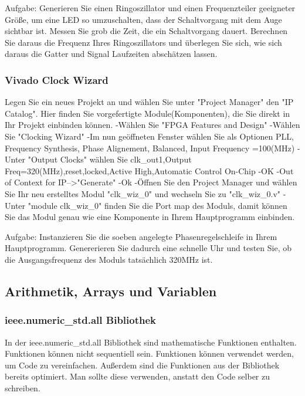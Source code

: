 \documentclass{article}
\begin{document}
Aufgabe:\newline
Generieren Sie einen Ringoszillator und einen Frequenzteiler geeigneter Größe, um eine LED so umzuschalten, dass der Schaltvorgang mit dem Auge sichtbar ist. Messen Sie grob die Zeit, die ein Schaltvorgang dauert. Berechnen Sie daraus die Frequenz Ihres Ringoszillators und \"uberlegen Sie sich, wie sich daraus die Gatter und Signal Laufzeiten absch\"atzen lassen.

\subsubsection{Vivado Clock Wizard}
Legen Sie ein neues Projekt an und w\"ahlen Sie unter "Project Manager" den "IP Catalog". Hier finden Sie vorgefertigte Module(Komponenten), die Sie direkt in Ihr Projekt einbinden k\"onnen.\newline
-W\"ahlen Sie "FPGA Features and Design"\newline
-W\"ahlen Sie "Clocking Wizard"\newline
-Im nun ge\"offneten Fenster w\"ahlen Sie als Optionen PLL, Frequency Synthesis, Phase Alignement, Balanced, Input Frequency =100(MHz)\newline
-Unter "Output Clocks" w\"ahlen Sie clk\_out1,Output Freq=320(MHz),reset,locked,Active High,Automatic Control On-Chip\newline
-OK\newline
-Out of Context for IP-->"Generate"\newline
-Ok\newline
-\"Offnen Sie den Project Manager und w\"ahlen Sie Ihr neu erstelltes Modul "clk\_wiz\_0" und wechseln Sie zu "clk\_wiz\_0.v"\newline
-Unter "module clk\_wiz\_0" finden Sie die Port map des Moduls, damit k\"onnen Sie das Modul genau wie eine Komponente in Ihrem Hauptprogramm einbinden.\newline

Aufgabe:\newline
Instanzieren Sie die soeben angelegte Phasenregelschleife in Ihrem Hauptprogramm. Genererieren Sie dadurch eine schnelle Uhr und testen Sie, ob die Ausgangsfrequenz des Moduls tats\"achlich 320MHz ist.

\subsection{Arithmetik, Arrays und Variablen}
\subsubsection{ieee.numeric\_std.all Bibliothek}
In der ieee.numeric\_std.all Bibliothek sind mathematische Funktionen enthalten. Funktionen k\"onnen nicht sequentiell sein. Funktionen k\"onnen verwendet werden, um Code zu vereinfachen. Außerdem sind die Funktionen aus der Bibliothek bereits optimiert. Man sollte diese verwenden, anstatt den Code selber zu schreiben.\newline 
\end{document}
